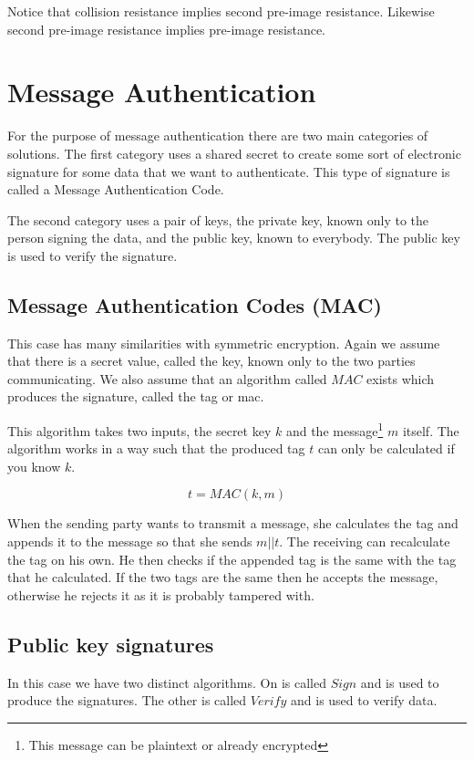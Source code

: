 Notice that collision resistance implies second pre-image resistance.
Likewise second pre-image resistance implies pre-image resistance.

\section{Message Authentication}

For the purpose of message authentication there are two main categories of solutions.
The first category uses a shared secret to create some sort of electronic signature for some data that we want to authenticate.
This type of signature is called a Message Authentication Code.

The second category uses a pair of keys, the private key, known only to the person signing the data, and the public key, known to everybody.
The public key is used to verify the signature.

\subsection{Message Authentication Codes (MAC)}

This case has many similarities with symmetric encryption.
Again we assume that there is a secret value, called the key, known only to the two parties communicating.
We also assume that an algorithm called $MAC$ exists which produces the signature, called the tag or mac.

This algorithm takes two inputs, the secret key $k$ and the message\footnote{This message can be plaintext or already encrypted} $m$ itself.
The algorithm works in a way such that the produced tag $t$ can only be calculated if you know $k$.

\[
  t = MAC(k, m)
\]

When the sending party wants to transmit a message, she calculates the tag and appends it to the message so that she sends $m||t$.
The receiving can recalculate the tag on his own.
He then checks if the appended tag is the same with the tag that he calculated.
If the two tags are the same then he accepts the message, otherwise he rejects it as it is probably tampered with.

\subsection{Public key signatures}

In this case we have two distinct algorithms.
On is called $Sign$ and is used to produce the signatures.
The other is called $Verify$ and is used to verify data.

